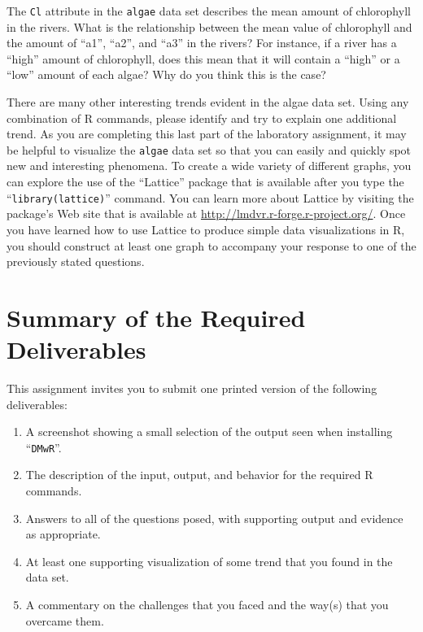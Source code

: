 The {\tt Cl} attribute in the {\tt algae} data set describes the mean amount of chlorophyll in the rivers. What is the
relationship between the mean value of chlorophyll and the amount of ``a1'', ``a2'', and ``a3'' in the rivers?
For instance, if a river has a ``high'' amount of chlorophyll, does this mean that it will contain a ``high'' or a
``low'' amount of each algae? Why do you think this is the case?

There are many other interesting trends evident in the algae data set. Using any combination of R commands, please
identify and try to explain one additional trend. As you are completing this last part of the laboratory assignment, it
may be helpful to visualize the {\tt algae} data set so that you can easily and quickly spot new and interesting
phenomena. To create a wide variety of different graphs, you can explore the use of the ``Lattice'' package that is
available after you type the ``{\tt library(lattice)}'' command. You can learn more about Lattice by visiting the
package's Web site that is available at \url{http://lmdvr.r-forge.r-project.org/}. Once you have learned how to use
Lattice to produce simple data visualizations in R, you should construct at least one graph to accompany your response
to one of the previously stated questions.


\section*{Summary of the Required Deliverables}

  This assignment invites you to submit one printed version of the following deliverables:

  \vspace*{-.05in}
  \begin{enumerate}
    \setlength{\itemsep}{0pt}
    \item A screenshot showing a small selection of the output seen when installing ``{\tt DMwR}''.
    \item The description of the input, output, and behavior for the required R commands.
    \item Answers to all of the questions posed, with supporting output and evidence as appropriate. 
    \item At least one supporting visualization of some trend that you found in the data set. 
    \item A commentary on the challenges that you faced and the way(s) that you overcame them.
  \end{enumerate}

